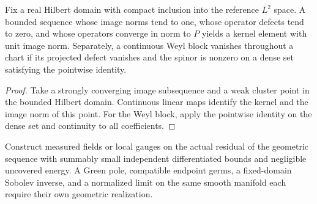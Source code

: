 \begin{proposition}
\label{prop:spin-compact-kernel}
\leanok
Fix a real Hilbert domain with compact inclusion into the reference
$L^2$ space. A bounded sequence whose image norms tend to one, whose
operator defects tend to zero, and whose operators converge in norm to
$P$ yields a kernel element with unit image norm. Separately, a continuous
Weyl block vanishes throughout a chart if its projected defect vanishes
and the spinor is nonzero on a dense set satisfying the pointwise identity.
\end{proposition}
\begin{proof}
\leanok
Take a strongly converging image subsequence and a weak cluster point in
the bounded Hilbert domain. Continuous linear maps identify the kernel
and the image norm of this point. For the Weyl block, apply the pointwise
identity on the dense set and continuity to all coefficients.
\end{proof}



\begin{openproblem}
\label{problem:physical-spin-residual}
\notready
Construct measured fields or local gauges on the actual residual of the
geometric sequence with summably small independent differentiated bounds
and negligible uncovered energy. A Green pole, compatible endpoint germs,
a fixed-domain Sobolev inverse, and a normalized limit on the same
smooth manifold each require their own geometric realization.
\end{openproblem}
